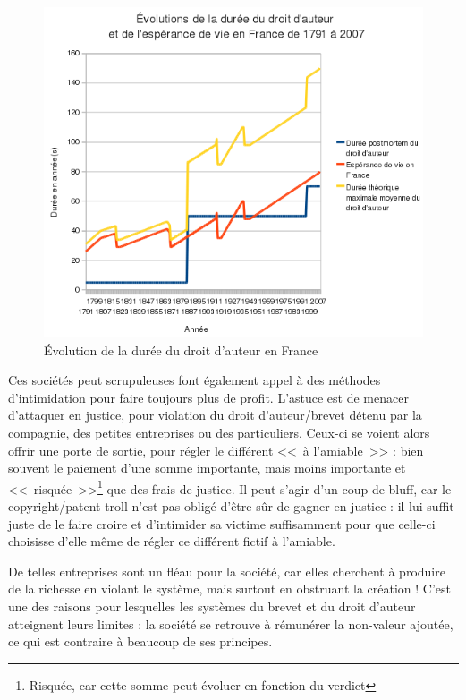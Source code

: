 \begin{figure}[H]
\center
\includegraphics[scale=.85]{images/duree_du_droit_d'auteur_en_France_depuis_1791.png}
\caption{Évolution de la durée du droit d'auteur en France}
\end{figure}

Ces sociétés peut scrupuleuses font également appel à des méthodes d'intimidation pour faire toujours plus de profit.
L'astuce est de menacer d'attaquer en justice, pour violation du droit d'auteur/brevet détenu par la compagnie, des petites entreprises ou des particuliers.
Ceux-ci se voient alors offrir une porte de sortie, pour régler le différent <<~à l'amiable~>> : bien souvent le paiement d'une somme importante, mais moins importante et <<~risquée~>>\footnote{Risquée, car cette somme peut évoluer en fonction du verdict} que des frais de justice.
Il peut s'agir d'un coup de bluff, car le copyright/patent troll n'est pas obligé d'être sûr de gagner en justice : il lui suffit juste de le faire croire et d'intimider sa victime suffisamment pour que celle-ci choisisse d'elle même de régler ce différent fictif à l'amiable.

De telles entreprises sont un fléau pour la société, car elles cherchent à produire de la richesse en violant le système, mais surtout en obstruant la création !
C'est une des raisons pour lesquelles les systèmes du brevet et du droit d'auteur atteignent leurs limites : la société se retrouve à rémunérer la non-valeur ajoutée, ce qui est contraire à beaucoup de ses principes.

